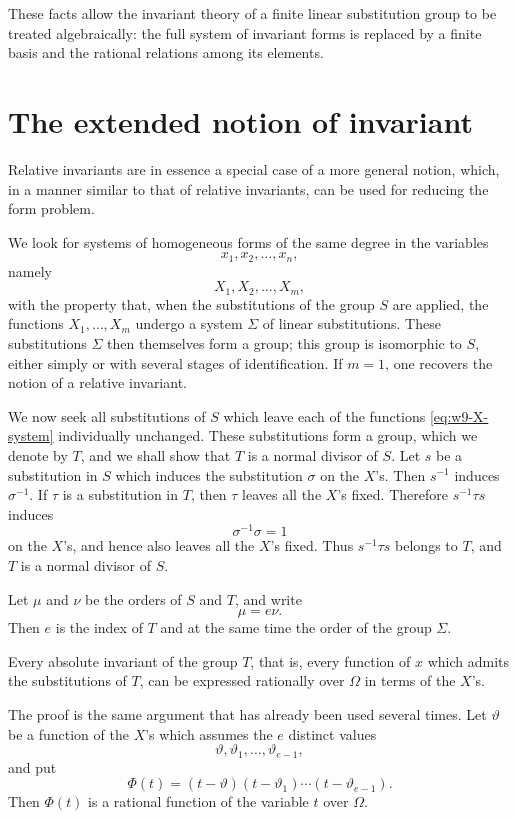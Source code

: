 \documentclass[11pt,a4paper]{book}
\begin{document}
These facts allow the invariant theory of a finite linear substitution group to be treated algebraically: the full system of invariant forms is replaced by a finite basis and the rational relations among its elements.

\section{The extended notion of invariant}

Relative invariants are in essence a special case of a more general notion, which, in a manner similar to that of relative invariants, can be used for reducing the form problem.

We look for systems of homogeneous forms of the same degree in the variables
\[
 x_1,x_2,\ldots,x_n,
\]
namely
\begin{equation}\label{eq:w9-X-system}
 X_1,X_2,\ldots,X_m,
\end{equation}
with the property that, when the substitutions of the group $S$ are applied, the functions $X_1,\ldots,X_m$ undergo a system $\Sigma$ of linear substitutions.  These substitutions $\Sigma$ then themselves form a group; this group is isomorphic to $S$, either simply or with several stages of identification.  If $m=1$, one recovers the notion of a relative invariant.

We now seek all substitutions of $S$ which leave each of the functions \eqref{eq:w9-X-system} individually unchanged.  These substitutions form a group, which we denote by $T$, and we shall show that $T$ is a normal divisor of $S$.  Let $s$ be a substitution in $S$ which induces the substitution $\sigma$ on the $X$'s.  Then $s^{-1}$ induces $\sigma^{-1}$.  If $\tau$ is a substitution in $T$, then $\tau$ leaves all the $X$'s fixed.  Therefore $s^{-1}\tau s$ induces
\[
 \sigma^{-1}\sigma=1
\]
on the $X$'s, and hence also leaves all the $X$'s fixed.  Thus $s^{-1}\tau s$ belongs to $T$, and $T$ is a normal divisor of $S$.

Let $\mu$ and $\nu$ be the orders of $S$ and $T$, and write
\[
 \mu=e\nu.
\]
Then $e$ is the index of $T$ and at the same time the order of the group $\Sigma$.

Every absolute invariant of the group $T$, that is, every function of $x$ which admits the substitutions of $T$, can be expressed rationally over $\Omega$ in terms of the $X$'s.

The proof is the same argument that has already been used several times.  Let $\vartheta$ be a function of the $X$'s which assumes the $e$ distinct values
\[
 \vartheta,\vartheta_1,\ldots,\vartheta_{e-1},
\]
and put
\begin{equation}\label{eq:w9-Phi-t}
 \Phi(t)=(t-\vartheta)(t-\vartheta_1)\cdots(t-\vartheta_{e-1}).
\end{equation}
Then $\Phi(t)$ is a rational function of the variable $t$ over $\Omega$.
\end{document}
